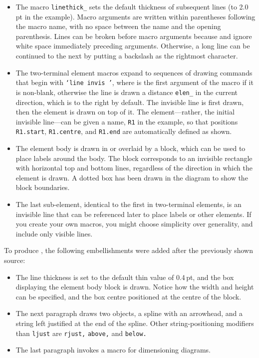 \begin{itemize}
\item The macro {\tt linethick\_} sets the default thickness of subsequent
   lines (to 2.0\,pt in the example).
   Macro arguments are written within parentheses
   following the macro name, with no space between the name and the
   opening parenthesis.  Lines can be broken before macro arguments
   because \Mfour and \dpic ignore white space immediately preceding
   arguments.  Otherwise, a long line can be continued to the next
   by putting a backslash as the rightmost character. 
\item The two-terminal element macros expand to sequences of drawing commands
   that begin with {\tt `line invis \linespec'},
   where \linespec is the first argument of the macro if it
   is non-blank, otherwise the line is drawn a distance
   {\tt elen\_} in the current direction, which is to the right by
   default.
   The invisible line is first drawn, then the element is drawn
   on top of it.
   The element---rather, the initial invisible line---can
   be given a name, {\tt R1} in the example, so that positions
   {\tt R1.start}, {\tt R1.centre}, and {\tt R1.end} are automatically
   defined as shown.
\item The element body is drawn in or overlaid by a block, which can be
   used to place labels around the body.
   The block corresponds to an invisible rectangle with horizontal top
   and bottom lines, regardless of the direction in which the element
   is drawn.  A dotted box has been drawn in the diagram to show the
   block boundaries.
\item The last sub-element, identical to the first in two-terminal
   elements, is an invisible line that can be referenced later to
   place labels or other elements.
   If you create your own macros, you might choose simplicity over generality,
   and include only visible lines.
  \end{itemize}

To produce , the following embellishments
were added after the previously shown source:
{\small  }

\begin{itemize}
\item The line thickness is set to the default thin value of \hbox{0.4\,pt},
   and the box displaying the element body block is drawn.  Notice how the
   width and height can be specified, and the box centre positioned at
   the centre of the block.
\item The next paragraph draws two objects, a spline with an arrowhead,
   and a string left justified at the end of the spline.  Other
   string-positioning modifiers than {\tt ljust} are {\tt rjust,}
   {\tt above,} and {\tt below.}

\item The last paragraph invokes a macro for dimensioning diagrams.
   \end{itemize}

